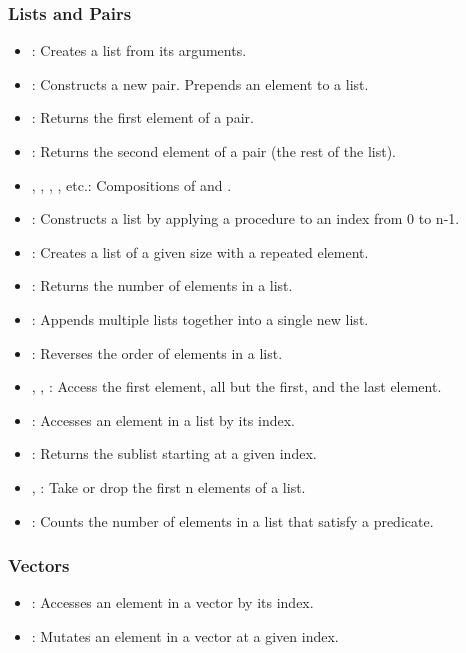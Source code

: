 \subsubsection{Lists and Pairs}
\begin{itemize}
    \item {}: Creates a list from its arguments.
    \item {}: Constructs a new pair. Prepends an element to a list.
    \item {}: Returns the first element of a pair.
    \item {}: Returns the second element of a pair (the rest of the list).
    \item {}, , , , etc.: Compositions of  and .
    \item {}: Constructs a list by applying a procedure to an index from 0 to n-1.
    \item {}: Creates a list of a given size with a repeated element.
    \item {}: Returns the number of elements in a list.
    \item {}: Appends multiple lists together into a single new list.
    \item {}: Reverses the order of elements in a list.
    \item {}, , : Access the first element, all but the first, and the last element.
    \item {}: Accesses an element in a list by its index.
    \item {}: Returns the sublist starting at a given index.
    \item {}, : Take or drop the first n elements of a list.
    \item {}: Counts the number of elements in a list that satisfy a predicate.
\end{itemize}

\subsubsection{Vectors}
\begin{itemize}
    \item {}: Accesses an element in a vector by its index.
    \item {}: Mutates an element in a vector at a given index.
\end{itemize}

